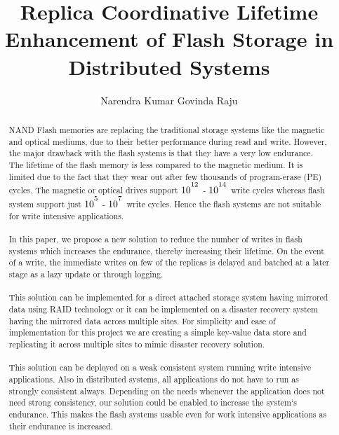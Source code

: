 \documentclass[11pt]{cover_page}
\begin{document}

\title{Replica Coordinative Lifetime Enhancement of Flash Storage in Distributed Systems}
\author{Narendra Kumar Govinda Raju}
\deanlinethree{}
\begin{frontmatter}

\maketitle

\begin{abstract}
NAND Flash memories are replacing the traditional storage systems like the magnetic and optical mediums, due to their better performance during read and write. However, the major drawback with the flash systems is that they have a very low endurance. The lifetime of the flash memory is less compared to the magnetic medium. It is limited due to the fact that they wear out after few thousands of program-erase (PE) cycles. The magnetic or optical drives support  $10^\textsuperscript{12}$ - $10^\textsuperscript{14}$  write cycles whereas flash system support just $10^\textsuperscript{5}$ - $10^\textsuperscript{7}$ write cycles. Hence the flash systems are not suitable for write intensive applications. \\\\ 
In this paper, we propose a new solution to reduce the number of writes in flash systems which increases the endurance, thereby increasing their lifetime. On the event of a write, the immediate writes on few of the replicas is delayed and batched at a later stage as a lazy update or through logging. \\\\ This solution can be implemented for a direct attached storage system having mirrored data using RAID technology or it can be implemented on a disaster recovery system having the mirrored data across multiple sites. For simplicity and ease of implementation for this project we are creating a simple key-value data store and replicating it across multiple sites to mimic disaster recovery solution. \\\\
This solution can be deployed on a weak consistent system running write intensive applications. Also in distributed systems, all applications do not have to run as strongly consistent always. Depending on the needs whenever the application does not need strong consistency, our solution could be enabled to increase the system`s endurance. This makes the flash systems usable even for work intensive applications as their endurance is increased. 


\end{abstract}
\end{frontmatter}
\end{document}
